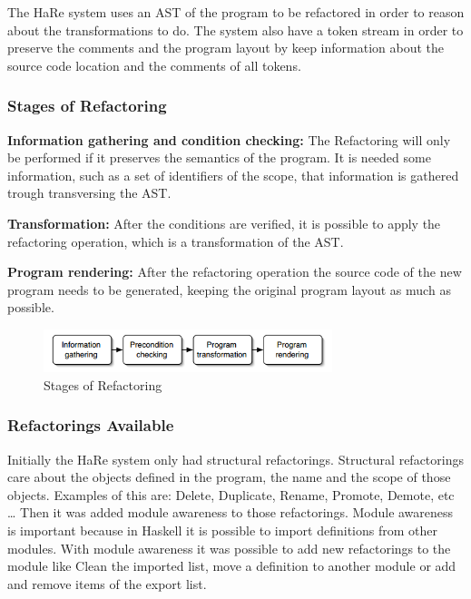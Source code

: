 The HaRe \cite{thompson2005refactoring} system uses an AST of the program to be refactored in order to reason about the transformations to do.
The system also have a token stream in order to preserve the comments and the program layout by keep information about the source code location and the comments of all tokens.

\subsubsection{Stages of Refactoring}
\hfill \break

{\bf Information gathering and condition checking:} The Refactoring will only be performed if it preserves the semantics of the program.
It is needed some information, such as a set of identifiers of the scope, that information is gathered trough transversing the AST.

{\bf Transformation:} After the conditions are verified, it is possible to apply the refactoring operation, which is a transformation of the AST.

{\bf Program rendering:} After the refactoring operation the source code of the new program needs to be generated, keeping the original program layout as much as possible.

\begin{figure}[h!]
  \centering
  \includegraphics[width=0.75\textwidth]{img/HaReStagesOfRefactoring.png}
  \caption{Stages of Refactoring}
  \label{fig:HaReStages}
\end{figure}

\subsubsection{Refactorings Available} %
\hfill \break

Initially the HaRe system only had structural refactorings. 
Structural refactorings care about the objects defined in the program, the name and the scope of those objects. Examples of this are: Delete, Duplicate, Rename, Promote, Demote, etc \ldots
Then it was added module awareness to those refactorings. 
Module awareness is important because in Haskell it is possible to import definitions from other modules.
With module awareness it was possible to add new refactorings to the module like Clean the imported list, move a definition to another module or add and remove items of the export list.


